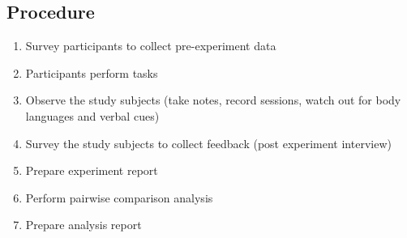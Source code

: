 \documentclass[letterpaper,cleveref]{lipics-v2019}
\theoremstyle{definition}
\begin{document}
\subsection {Procedure}
\begin {enumerate}

\item Survey participants to collect pre-experiment data
\item Participants perform tasks
\item Observe the study subjects (take notes, record sessions, watch out for body languages and verbal cues)
\item Survey the study subjects to collect feedback (post experiment interview)
\item Prepare experiment report
\item Perform pairwise comparison analysis
\item Prepare analysis report
\end {enumerate}

\end{document}
